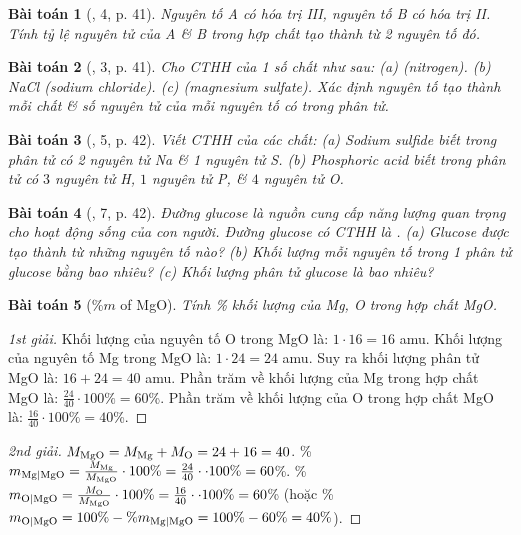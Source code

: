 \documentclass{article}
\newtheorem{baitoan}{Bài toán}
\begin{document}
\begin{baitoan}[\cite{SGK_KHTN_7_Canh_Dieu}, 4, p. 41]
	Nguyên tố A có hóa trị III, nguyên tố B có hóa trị II. Tính tỷ lệ nguyên tử của A \& B trong hợp chất tạo thành từ 2 nguyên tố đó.
\end{baitoan}

\begin{baitoan}[\cite{SGK_KHTN_7_Canh_Dieu}, 3, p. 41]
	Cho {\rm CTHH} của 1 số chất như sau: (a) \emph{} (nitrogen). (b) \emph{NaCl} (sodium chloride). (c) \emph{} (magnesium sulfate). Xác định nguyên tố tạo thành mỗi chất \& số nguyên tử của mỗi nguyên tố có trong phân tử.
\end{baitoan}

\begin{baitoan}[\cite{SGK_KHTN_7_Canh_Dieu}, 5, p. 42]
	Viết {\rm CTHH} của các chất: (a) Sodium sulfide biết trong phân tử có 2 nguyên tử \emph{Na} \& 1 nguyên tử \emph{S}. (b) Phosphoric acid biết trong phân tử có $3$ nguyên tử \emph{H}, $1$ nguyên tử \emph{P}, \& $4$ nguyên tử \emph{O}.
\end{baitoan}

\begin{baitoan}[\cite{SGK_KHTN_7_Canh_Dieu}, 7, p. 42]
	Đường glucose là nguồn cung cấp năng lượng quan trọng cho hoạt động sống của con người. Đường glucose có {\rm CTHH} là \emph{}. (a) Glucose được tạo thành từ những nguyên tố nào? (b) Khối lượng mỗi nguyên tố trong 1 phân tử glucose bằng bao nhiêu? (c) Khối lượng phân tử glucose là bao nhiêu?
\end{baitoan}

\begin{baitoan}[\%$m$ of MgO]
	Tính \% khối lượng của \emph{Mg, O} trong hợp chất \emph{MgO}.
\end{baitoan}

\begin{proof}[1st giải]
	Khối lượng của nguyên tố O trong MgO là: $1\cdot16 = 16$ amu. Khối lượng của nguyên tố Mg trong MgO là: $1\cdot24 = 24$ amu. Suy ra khối lượng phân tử MgO là: $16 + 24 = 40$ amu. Phần trăm về khối lượng của Mg trong hợp chất MgO là: $\frac{24}{40}\cdot100\% = 60$\%. Phần trăm về khối lượng của O trong hợp chất MgO là: $\frac{16}{40}\cdot100\% = 40$\%.
\end{proof}

\begin{proof}[2nd giải]
	$M_{\rm MgO} = M_{\rm Mg} + M_{\rm O} = 24 + 16 = 40$. \%$m_{\rm Mg|MgO} = \frac{M_{\rm Mg}}{M_{\rm MgO}}\cdot100\% = \frac{24}{40}\cdot\cdot100\% = 60$\%. \%$m_{\rm O|MgO} = \frac{M_{\rm O}}{M_{\rm MgO}}\cdot100\% = \frac{16}{40}\cdot\cdot100\% = 60$\% (hoặc \%$m_{\rm O|MgO} = 100\% - \%m_{\rm Mg|MgO} = 100\% - 60\% = 40\%$).
\end{proof}
\end{document}
